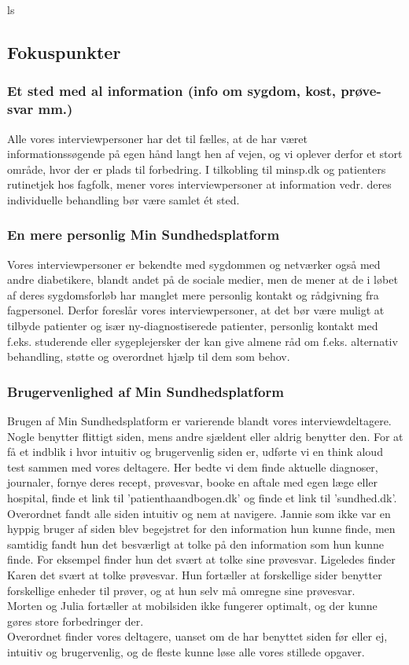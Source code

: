 ls
\subsection{Fokuspunkter}
\subsubsection{Et sted med al information (info om sygdom, kost, prøve-svar mm.)}
Alle vores interviewpersoner har det til fælles, at de har været informationssøgende på egen hånd langt hen af vejen, og vi oplever derfor et stort område, hvor der er plads til forbedring. I tilkobling til minsp.dk og patienters rutinetjek hos fagfolk, mener vores interviewpersoner at information vedr. deres individuelle behandling bør være samlet ét sted.

\subsubsection{En mere personlig Min Sundhedsplatform}
Vores interviewpersoner er bekendte med sygdommen og netværker også med andre diabetikere, blandt andet på de sociale medier, men de mener at de i løbet af deres sygdomsforløb har manglet mere personlig kontakt og rådgivning fra fagpersonel. Derfor foreslår vores interviewpersoner, at det bør være muligt at tilbyde patienter og især ny-diagnostiserede patienter, personlig kontakt med f.eks. studerende eller sygeplejersker der kan give almene råd om f.eks. alternativ behandling, støtte og overordnet hjælp til dem som behov.

\subsubsection{Brugervenlighed af Min Sundhedsplatform}
Brugen af Min Sundhedsplatform er varierende blandt vores interviewdeltagere. Nogle benytter flittigt siden, mens andre sjældent eller aldrig benytter den. For at få et indblik i hvor intuitiv og brugervenlig siden er, udførte vi en think aloud test sammen med vores deltagere. Her bedte vi dem finde aktuelle diagnoser, journaler, fornye deres recept, prøvesvar, booke en aftale med egen læge eller hospital, finde et link til 'patienthaandbogen.dk' og finde et link til 'sundhed.dk'. Overordnet fandt alle siden intuitiv og nem at navigere. Jannie som ikke var en hyppig bruger af siden blev begejstret for den information hun kunne finde, men samtidig fandt hun det besværligt at tolke på den information som hun kunne finde. For eksempel finder hun det svært at tolke sine prøvesvar. Ligeledes finder Karen det svært at tolke prøvesvar. Hun fortæller at forskellige sider benytter forskellige enheder til prøver, og at hun selv må omregne sine prøvesvar.\\
Morten og Julia fortæller at mobilsiden ikke fungerer optimalt, og der kunne gøres store forbedringer der.\\
Overordnet finder vores deltagere, uanset om de har benyttet siden før eller ej, intuitiv og brugervenlig, og de fleste kunne løse alle vores stillede opgaver.


